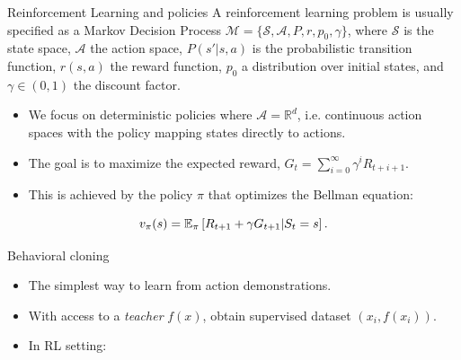 \begin{frame}{Reinforcement Learning and policies}
    A reinforcement learning problem is usually specified as a Markov Decision Process $\mathcal{M} = \{\mathcal{S}, \mathcal{A}, P, r, p_0, \gamma\}$, where $\mathcal{S}$ is the state space, $\mathcal{A}$ the action space, $P(s'|s,a)$ is the probabilistic transition function, $r(s,a)$ the reward function, $p_0$ a distribution over initial states, and $\gamma \in (0,1)$ the discount factor. 
    \begin{itemize}
        \item We focus on deterministic policies where $\mathcal{A} = \mathbb{R}^d$, i.e. continuous action spaces with the policy mapping states directly to actions.
        \item The goal is to maximize the expected reward, $G_t = \sum_{i=0}^\infty \gamma^i R_{t+i+1}$. 
        \item This is achieved by the policy $\pi$ that optimizes the Bellman equation:
    \end{itemize}
    \begin{equation*}
        v_\pi(s) = \operatorname{\mathbb{E}}_\pi\left[R_{t+1} + \gamma G_{t+1} | S_t=s\right].
    \end{equation*}

\end{frame}

\begin{frame}{Behavioral cloning}
    \begin{itemize}
        \item The simplest way to learn from action demonstrations.
        \item With access to a \emph{teacher} $f(x)$, obtain supervised dataset $(x_i, f(x_i))$.
        \item In RL setting: 
    \end{itemize}
    
\end{frame}

\note[itemize]{
    \
}


